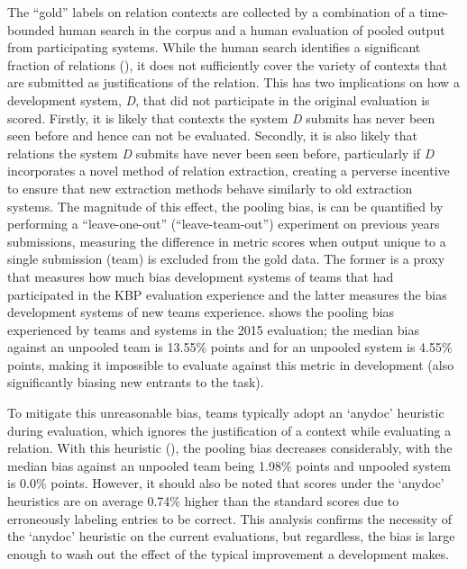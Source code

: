 The ``gold'' labels on relation contexts are collected by a combination of a time-bounded human search in the corpus and a human evaluation of pooled output from participating systems.
While the human search identifies a significant fraction of relations (),
  it does not sufficiently cover the variety of contexts that are submitted as justifications of the relation. 
This has two implications on how a development system, \textit{D}, that did not participate in the original evaluation is scored.
Firstly, it is likely that contexts  the system \textit{D} submits has never been seen before and hence can not be evaluated.
Secondly, it is also likely that relations the system \textit{D} submits have never been seen before, particularly if \textit{D} incorporates a novel method of relation extraction, creating a perverse incentive to ensure that new extraction methods behave similarly to old extraction systems.
The magnitude of this effect, the pooling bias, is can be quantified by performing a ``leave-one-out'' (``leave-team-out'') experiment on previous years submissions, measuring the difference in metric scores when output unique to a single submission (team) is excluded from the gold data.
The former is a proxy that measures how much bias development systems of teams that had participated in the KBP evaluation experience and the latter measures the bias development systems of new teams experience.
 shows the pooling bias experienced by teams and systems in the 2015 evaluation;
  the median bias against an unpooled team is 13.55\% \fone{} points and for an unpooled system is 4.55\% \fone{} points,
  making it impossible to evaluate against this metric in development (also significantly biasing new entrants to the task).

To mitigate this unreasonable bias, teams typically adopt an `anydoc' heuristic during evaluation, which ignores the justification of a context while evaluating a relation.
With this heuristic (), the pooling bias decreases considerably, with 
  the median bias against an unpooled team being 1.98\% \fone{} points and unpooled system is 0.0\% \fone{} points.
However, it should also be noted that scores under the `anydoc' heuristics are on average 0.74\% higher than the standard scores due to erroneously labeling entries to be correct.
This analysis confirms the necessity of the `anydoc' heuristic on the current evaluations, but regardless, the bias is large enough to wash out the effect of the typical improvement a development makes.

